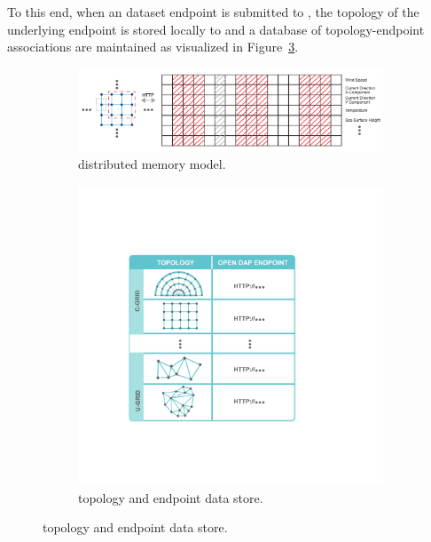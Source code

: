 To this end, when an dataset endpoint is submitted to \sciwms{}, the
topology of the underlying endpoint is stored locally to \sciwms{} and
a database of topology-endpoint associations are maintained as
visualized in Figure~\ref{fig:sciwms_topology_endpoints}. 

\begin{figure}[ht!]
  \centering
  \begin{subfigure}[t]{0.45\textwidth}
    \includegraphics[width=\textwidth]{../figs/topology_memModel}
    \caption{\sciwms{} distributed memory model.}
    \label{fig:sciwms_mem_model}
  \end{subfigure}
  \begin{subfigure}[t]{0.455\textwidth}
    \includegraphics[width=\textwidth]{../figs/sciwms_book_db_topology_endpoints.pdf}
    \caption{\Sciwms{} topology and endpoint data store.}
    \label{fig:sciwms_topology_endpoints}
  \end{subfigure}
\end{figure}


